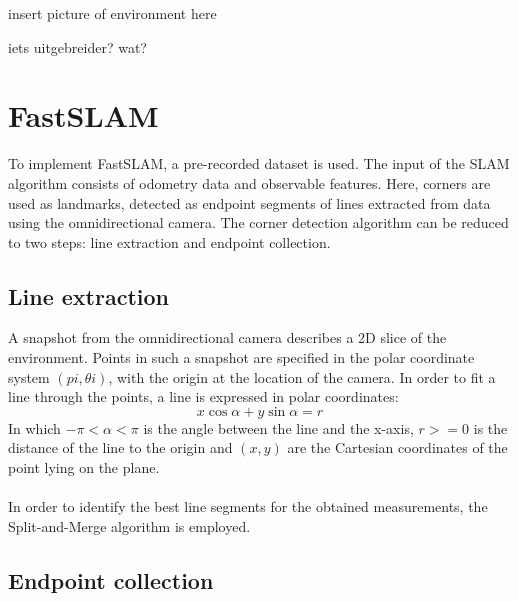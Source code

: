 \documentclass[12pt]{article}
\begin{document}
insert picture of environment here

iets uitgebreider? wat?

\section{FastSLAM}
To implement FastSLAM, a pre-recorded dataset is used. The input of the SLAM algorithm consists of odometry data and observable features. Here, corners are used as landmarks, detected as endpoint segments of lines extracted from data using the omnidirectional camera. The corner detection algorithm can be reduced to two steps: line extraction and endpoint collection.
\subsection{Line extraction}
A snapshot from the omnidirectional camera describes a 2D slice of the environment. Points in such a snapshot are specified in the polar coordinate system $(pi, {\theta}i)$, with the origin at the location of the camera. In order to fit a line through the points, a line is expressed in polar coordinates:
\begin{equation}
	x\cos{\alpha} + y\sin{\alpha} = r
\end{equation}
In which $-\pi < \alpha < \pi$ is the angle between the line and the x-axis, $r >= 0$ is the distance of the line to the origin and $(x, y)$ are the Cartesian coordinates of the point lying on the plane. \\ \\
In order to identify the best line segments for the obtained measurements, the Split-and-Merge algorithm is employed.
\subsection{Endpoint collection}
\end{document}
